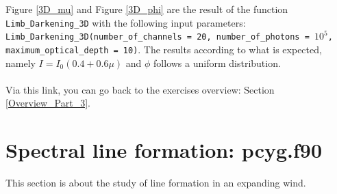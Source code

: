 \documentclass[../main/main.tex]{subfiles}
\begin{document}
Figure \ref{3D_mu} and Figure \ref{3D_phi}  are the result of 
the function \texttt{Limb\_Darkening\_3D} with the following input parameters: \texttt{Limb\_Darkening\_3D(number\_of\_channels = 20, number\_of\_photons = $10^5$, \\ maximum\_optical\_depth = 10)}. The results according to what is expected, namely $I = I_0(0.4+0.6\mu)$ and $\phi$ follows a uniform distribution.

\paragraph{}
\noindent{}

\vspace{0.4cm}
Via this link, you can go back to the exercises overview: Section \underline{\ref{Overview_Part_3}}.


\newpage
\section{Spectral line formation: pcyg.f90}
This section is about the study of line formation in an expanding wind.
\end{document}
